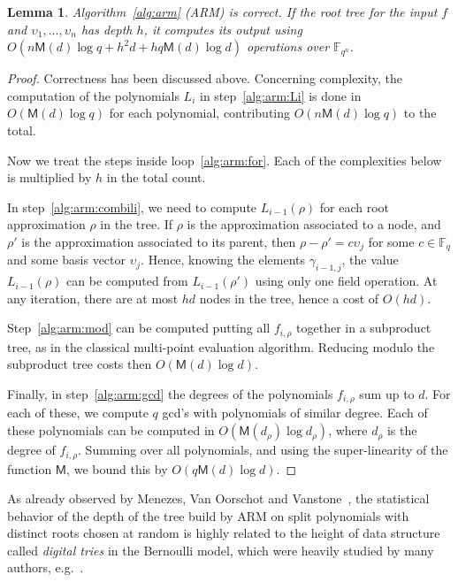 \documentclass{sig-alternate}
\newcommand{\ff}[1]{\mathbb{F}_{#1}}
\newcommand{\dd}{d}
\newcommand{\qq}{q}
\newcommand{\nn}{n}
\newcommand{\qn}{{\qq^\nn}}
\newcommand{\basef}{\ff{\qq}}
\newcommand{\extf}{\ff{\qn}}
\newcommand{\Mul}{\mathsf{M}}
\newcounter{algo}
\newtheorem{Lem}{Lemma}
\begin{document}
 \begin{Lem}
 \label{complexity_arm}
   Algorithm~\ref{alg:arm} (ARM) is correct. If the root tree for the
   input $f$ and $\upsilon_1,\dots,\upsilon_\nn$ has depth $h$, it
   computes its output using $O(\nn\Mul(\dd)\log\qq + h^2\dd +
   h\qq\Mul(\dd)\log\dd)$ operations over $\extf$.
 \end{Lem}
 \begin{proof}
   Correctness has been discussed above. Concerning complexity, the
   computation of the polynomials $L_i$ in step~\ref{alg:arm:Li} is
   done in $O(\Mul(\dd)\log\qq)$ for each polynomial, contributing
   $O(\nn\Mul(\dd)\log\qq)$ to the total.

   Now we treat the steps inside loop~\ref{alg:arm:for}.  Each of the
   complexities below is multiplied by $h$ in the total count.

   In step~\ref{alg:arm:combili}, we need to compute $L_{i-1}(\rho)$
   for each root approximation $\rho$ in the tree. If $\rho$ is the
   approximation associated to a node, and $\rho'$ is the
   approximation associated to its parent, then
   $\rho-\rho'=c\upsilon_j$ for some $c\in\basef$ and some basis
   vector $\upsilon_j$. Hence, knowing the elements $\gamma_{i-1,j}$,
   the value $L_{i-1}(\rho)$ can be computed from $L_{i-1}(\rho')$
   using only one field operation. At any iteration, there are at most
   $hd$ nodes in the tree, hence a cost of $O(hd)$.

   Step~\ref{alg:arm:mod} can be computed putting all $f_{i,\rho}$
   together in a subproduct tree, as in the classical multi-point
   evaluation algorithm. Reducing modulo the subproduct tree costs
   then $O(\Mul(\dd)\log\dd)$.

   Finally, in step~\ref{alg:arm:gcd} the degrees of the polynomials
   $f_{i,\rho}$ sum up to $\dd$. For each of these, we compute $\qq$
   gcd's with polynomials of similar degree. Each of these polynomials
   can be computed in $O(\Mul(\dd_\rho)\log\dd_\rho)$, where
   $\dd_\rho$ is the degree of $f_{i,\rho}$. Summing over all
   polynomials, and using the super-linearity of the function $\Mul$,
   we bound this by $O(\qq\Mul(d)\log d)$.
 \end{proof}


 As already observed by Menezes, Van Oorschot and Vanstone~\cite{Menvanovans92}, 
the statistical behavior of the depth of the tree build by ARM on split polynomials with distinct roots chosen at random is highly 
related to the height of data structure called \emph{digital tries} in the Bernoulli model, which were heavily studied 
by many authors, e.g.~\cite{szpankowski1986analysis}.   
 
\end{document}

